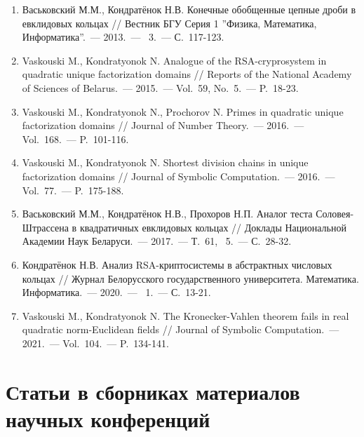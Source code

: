 \documentclass[_00_dissertation.tex]{subfiles}
\begin{document}
\begin{enumerate}

    \item \label{source:Vestnik_BSU_2013}
    Васьковский М.М., Кондратёнок Н.В. Конечные обобщенные цепные дроби в евклидовых кольцах // Вестник БГУ Серия 1 ''Физика, Математика, Информатика''.~--- 2013.~--- \textnumero~3.~--- С.~117-123.

    \item \label{source:NANB_2015}
    Vaskouski M., Kondratyonok N. Analogue of the RSA-cryprosystem in quadratic unique factorization domains // Reports of the National Academy of Sciences of Belarus.~--- 2015.~--- Vol.~59, No.~5.~--- P.~18-23.

    \item \label{source:JNT_2016}
    Vaskouski M., Kondratyonok N., Prochorov N. Primes in quadratic unique factorization domains // Journal of Number Theory.~--- 2016.~--- Vol.~168.~--- P.~101-116.

    \item \label{source:JSC_2016}
    Vaskouski M., Kondratyonok N. Shortest division chains in unique factorization domains // Journal of Symbolic Computation.~--- 2016.~--- Vol.~77.~--- P.~175-188.

    \item \label{source:NANB_2017}
    Васьковский М.М., Кондратёнок Н.В., Прохоров Н.П. Аналог теста Соловея-Штрассена в квадратичных евклидовых кольцах // Доклады Национальной Академии Наук Беларуси.~--- 2017.~--- Т.~61, \textnumero~5.~--- С.~28-32.

    \item \label{source:BSU_Journal_2020}
    Кондратёнок Н.В. Анализ RSA-криптосистемы в абстрактных числовых кольцах // Журнал Белорусского государственного университета. Математика. Информатика.~--- 2020.~--- \textnumero~1.~--- С.~13-21.

    \item \label{source:JSC_2021}
    Vaskouski M., Kondratyonok N. The Kronecker-Vahlen theorem fails in real quadratic norm-Euclidean fields // Journal of Symbolic Computation.~--- 2021.~--- Vol.~104.~--- P.~134-141.
\end{enumerate}

\vspace{-4ex}
\section*{\fontsize{14}{15}\selectfont Статьи в сборниках материалов научных конференций}
\vspace{-4ex}
\end{document}
